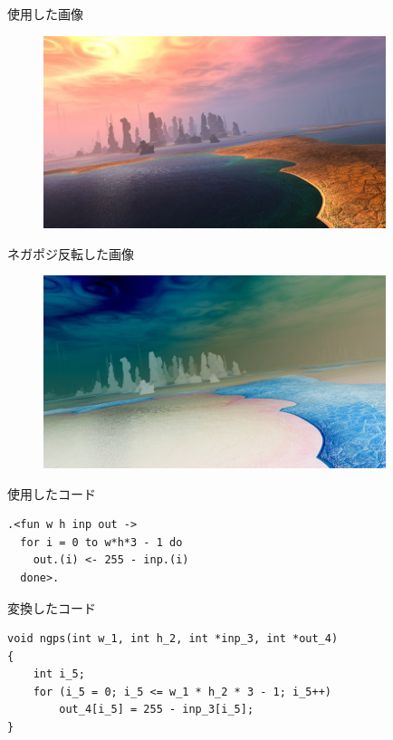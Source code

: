 \documentclass[14pt,dvipdfmx]{beamer}
\theoremstyle{definition}
\begin{document}
\begin{frame}{使用した画像}
  \begin{figure}[ht]
    \centering
    \includegraphics[width=100mm]{./img/planet.jpg}
  \end{figure}

\end{frame}
\begin{frame}{ネガポジ反転した画像}
  \begin{figure}[ht]
    \centering
    \includegraphics[width=100mm]{./img/planet_nega.jpg}
  \end{figure}
\end{frame}

\begin{frame}[containsverbatim]{使用したコード}
\begin{verbatim}
.<fun w h inp out ->
  for i = 0 to w*h*3 - 1 do
    out.(i) <- 255 - inp.(i)
  done>.
\end{verbatim}
\end{frame}

\begin{frame}[containsverbatim]{変換したコード}
  \small
\begin{verbatim}
void ngps(int w_1, int h_2, int *inp_3, int *out_4)
{
    int i_5;
    for (i_5 = 0; i_5 <= w_1 * h_2 * 3 - 1; i_5++)
        out_4[i_5] = 255 - inp_3[i_5];
}
\end{verbatim}
\end{frame}
\end{document}
